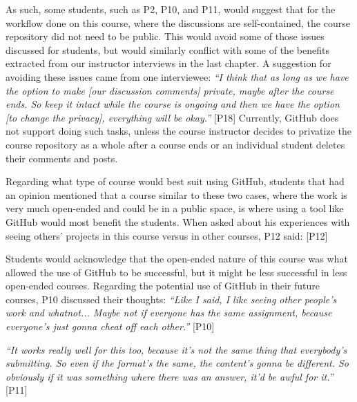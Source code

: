 As such, some students, such as P2, P10, and P11, would suggest that for the workflow done on this course, where the discussions are self-contained, the course repository did not need to be public. This would avoid some of those issues discussed for students, but would similarly conflict with some of the benefits extracted from our instructor interviews in the last chapter. A suggestion for avoiding these issues came from one interviewee: \textit{``I think that as long as we have the option to make [our discussion comments] private, maybe after the course ends. So keep it intact while the course is ongoing and then we have the option [to change the privacy], everything will be okay.''} [P18] Currently, GitHub does not support doing such tasks, unless the course instructor decides to privatize the course repository as a whole after a course ends or an individual student deletes their comments and posts. %

Regarding what type of course would best suit using GitHub, students that had an opinion mentioned that a course similar to these two cases, where the work is very much open-ended and could be in a public space, is where using a tool like GitHub would most benefit the students. When asked about his experiences with seeing others' projects in this course versus in other courses, P12 said:  [P12]

Students would acknowledge that the open-ended nature of this course was what allowed the use of GitHub to be successful, but it might be less successful in less open-ended courses. Regarding the potential use of GitHub in their future courses, P10 discussed their thoughts: \textit{``Like I said, I like seeing other people's work and whatnot... Maybe not if everyone has the same assignment, because everyone's just gonna cheat off each other.''} [P10]

\textit{``It works really well for this too, because it's not the same thing that everybody's submitting. So even if the format's the same, the content's gonna be different. So obviously if it was something where there was an answer, it'd be awful for it.''} [P11]


